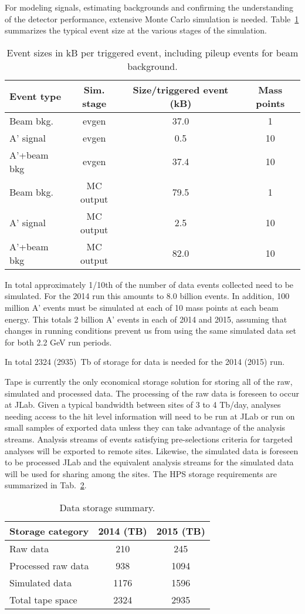 For modeling signals, estimating backgrounds and confirming the understanding of the detector 
performance, extensive Monte Carlo simulation is needed. Table~\ref{tab:mc_event_size} summarizes 
the typical event size at the various stages of the simulation. 
\begin{table}[]
\centering
\begin{tabular}{|lccc|}
\hline
Event type & Sim. stage & Size/triggered event (kB) & Mass points  \\
\hline
Beam bkg.  & evgen	& 37.0	& 1	\\
A' signal & evgen	& 0.5	& 10	\\
A'+beam bkg & evgen	& 37.4	& 10	\\
\hline
Beam bkg.  & MC output	& 79.5	& 1	\\
A' signal & MC output	& 2.5	& 10	\\
A'+beam bkg & MC output	& 82.0	& 10	\\
\hline
\end{tabular}
\caption{{\small Event sizes in kB per triggered event, including pileup events for beam background. }}
\label{tab:mc_event_size}
\end{table}

In total approximately 1/10th of the number of data events collected need to be simulated. For the 2014 run this amounts to 8.0 billion events.
In addition, 100 million A' events must be simulated at each of 10 mass points at each beam energy. 
This totals 2 billion A' events in each of 2014 and 2015, assuming that changes in running conditions prevent us from using the same simulated data set for both 2.2 GeV run periods.

In total 2324 (2935)~Tb of storage for data is needed for the 2014 (2015) run.

Tape is currently the only economical storage
solution for storing all of the raw, simulated and processed data.
The processing of the raw data is foreseen to occur at JLab. Given a
typical bandwidth between sites of 3 to 4 Tb/day, analyses needing
access to the hit level information will need to be run at JLab or run
on small samples of exported data unless they can take advantage of the
analysis streams. Analysis streams of events satisfying
pre-selections criteria for targeted analyses will be exported to remote
sites. Likewise, the simulated data is foreseen to be processed JLab
and the equivalent analysis streams for the simulated data
will be used for sharing among the sites.
The HPS storage requirements are summarized in Tab.~\ref{tab:datastorage}.
\begin{table}[tbp]
\centering
\begin{tabular}{|l|c|c|}
\hline
Storage category & 2014 (TB) & 2015 (TB) \\
\hline
Raw data & 210 & 245 \\
Processed raw data & 938 & 1094 \\
Simulated data & 1176 & 1596 \\
\hline
Total tape space & 2324 & 2935 \\
\hline
\end{tabular}
\caption{{\small Data storage summary.}}
\label{tab:datastorage}
\end{table}

